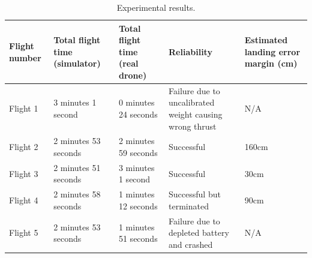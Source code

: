 
\begin{table}[t]
  \linespread{0.6}\selectfont
  \renewcommand{\arraystretch}{1.5}
  \caption{Experimental results.}
  \begin{center}
    \begin{tabu} to \textwidth {| X[c] | X[c] | X[c] | X[c] | X[c] |}
      \hline \textbf{Flight number} & \textbf{Total flight time (simulator)} & \textbf{Total flight time (real drone)} & \textbf{Reliability}  & \textbf{Estimated landing error margin (cm)}\\ \hline \hline
      Flight 1 & 3 minutes 1 second & 0 minutes 24 seconds &  Failure due to uncalibrated weight causing wrong thrust & N/A\\ [10pt] \hline
      Flight 2 & 2 minutes 53 seconds  & 2 minutes 59 seconds & Successful & 160cm\\ [10pt] \hline
      Flight 3 & 2 minutes 51 seconds & 3 minutes 1 second & Successful & 30cm\\ [10pt] \hline 
      Flight 4 & 2 minutes 58 seconds & 1 minutes 12 seconds & Successful but terminated & 90cm\\ [10pt] \hline
      Flight 5 & 2 minutes 53 seconds & 1 minutes 51 seconds & Failure due to depleted battery and crashed & N/A\\ [10pt] \hline
    \end{tabu}
  \end{center}
  \label{table:allresults}
\end{table}
\FloatBarrier


